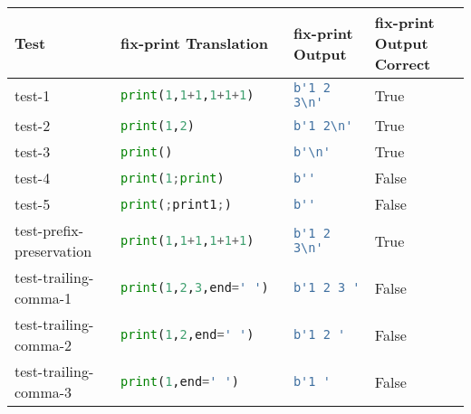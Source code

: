 \begin{table}[h!]
    \centering
    \begin{tabular}{@{}l|lll@{}}
    \toprule
    Test                                  & fix-print Translation             & fix-print Output             & fix-print Output Correct \\ \midrule
    test-1                               & \lstinline[language=Python, style=pythonstyle]|print(1,1+1,1+1+1)                | & \lstinline[language=Python, style=pythonstyle]|b'1 2 3\n'    | & True                      \\
    test-2                               & \lstinline[language=Python, style=pythonstyle]|print(1,2)                        | & \lstinline[language=Python, style=pythonstyle]|b'1 2\n'      | & True                      \\
    test-3                               & \lstinline[language=Python, style=pythonstyle]|print()                           | & \lstinline[language=Python, style=pythonstyle]|b'\n'         | & True                      \\
    test-4                               & \lstinline[language=Python, style=pythonstyle]|print(1;print)                    | & \lstinline[language=Python, style=pythonstyle]|b''           |                & False                     \\
    test-5                               & \lstinline[language=Python, style=pythonstyle]|print(;print1;)                   | & \lstinline[language=Python, style=pythonstyle]|b''           |                & False                     \\
    test-prefix-preservation            & \lstinline[language=Python, style=pythonstyle]|print(1,1+1,1+1+1)                | & \lstinline[language=Python, style=pythonstyle]|b'1 2 3\n'    | & True                      \\
    test-trailing-comma-1              & \lstinline[language=Python, style=pythonstyle]|print(1,2,3,end=' ')              | & \lstinline[language=Python, style=pythonstyle]|b'1 2 3 '     |                & False                     \\
    test-trailing-comma-2              & \lstinline[language=Python, style=pythonstyle]|print(1,2,end=' ')                | & \lstinline[language=Python, style=pythonstyle]|b'1 2 '       |                & False                     \\
    test-trailing-comma-3              & \lstinline[language=Python, style=pythonstyle]|print(1,end=' ')                  | & \lstinline[language=Python, style=pythonstyle]|b'1 '         |                & False                     \\

\end{tabular}
\end{table}
